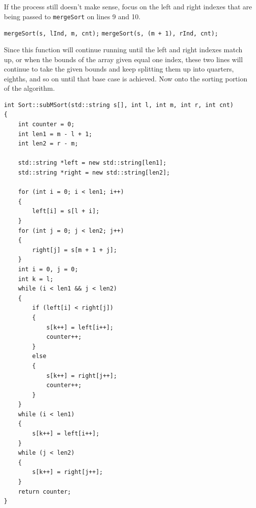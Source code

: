 \documentclass[letterpaper, 10pt]{article}
\begin{document}
If the process still doesn't make sense, focus on the left and right indexes that are being passed to \texttt{mergeSort} on lines 9 and 10. 

\begin{center}
		\texttt{mergeSort(s, lInd, m, cnt);} \break
		\texttt{mergeSort(s, (m + 1), rInd, cnt);}
\end{center}

 Since this function will continue running until the left and right indexes match up, or when the bounds of the array given equal one index, these two lines will continue to take the given bounds and keep splitting them up into quarters, eighths, and so on until that base case is achieved. Now onto the sorting portion of the algorithm.
 
 \begin{addmargin}[-5em]{1em}
\begin{small}
\begin{verbatim}
int Sort::subMSort(std::string s[], int l, int m, int r, int cnt)
{
	int counter = 0;
	int len1 = m - l + 1;
	int len2 = r - m;

	std::string *left = new std::string[len1];
	std::string *right = new std::string[len2];

	for (int i = 0; i < len1; i++)
	{
		left[i] = s[l + i];
	}
	for (int j = 0; j < len2; j++)
	{
		right[j] = s[m + 1 + j];
	}
	int i = 0, j = 0;
	int k = l;
	while (i < len1 && j < len2) 
	{
		if (left[i] < right[j])
		{
			s[k++] = left[i++];
			counter++;
		}
		else
		{
			s[k++] = right[j++];
			counter++;
		}
	}
	while (i < len1)
	{
		s[k++] = left[i++];
	}
	while (j < len2)
	{
		s[k++] = right[j++];
	}
	return counter;
}

\end{verbatim}
\end{small}
\end{addmargin}
\end{document}
